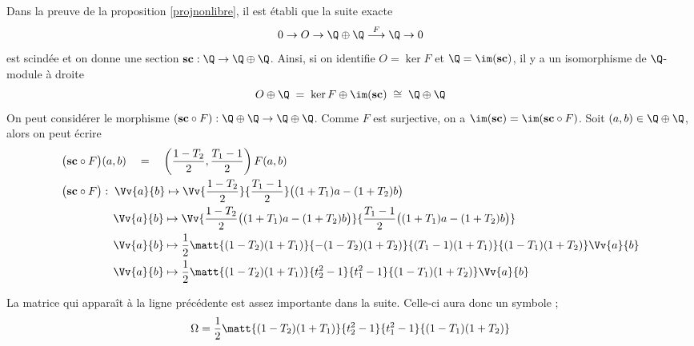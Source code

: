 Dans la preuve de la proposition \ref{projnonlibre}, il est établi que la suite exacte 
$$ 0 \rightarrow O \rightarrow \Q \oplus \Q \stackrel{F}{\longrightarrow}\Q \rightarrow 0 $$ 
est scindée et on donne une section $\mathbf{sc} : \Q \rightarrow \Q \oplus \Q$. Ainsi, si on identifie $O = \ker F$ et $\Q = \im (\mathbf{sc})$, il y a un isomorphisme de $\Q$-module à droite 
\begin{equation} \label{decompositionisomar}
O \oplus \Q \; = \; \ker F \oplus \im (\mathbf{sc}) \; \cong \; \Q \oplus \Q
\end{equation}
On peut considérer le morphisme $(\mathbf{sc} \circ F) : \Q \oplus \Q \rightarrow \Q \oplus \Q$. Comme $F$ est surjective, on a $\im (\mathbf{sc}) = \im (\mathbf{sc} \circ F)$. Soit $(a,b) \in \Q \oplus \Q$, alors on peut écrire
\begin{align*}
&\big(\mathbf{sc} \circ F\big)(a,b) \quad = \quad \left(\frac{1-T_2}{2},\frac{T_1-1}{2}\right)F(a,b)\\
&\big(\mathbf{sc} \circ F\big): \; \Vv{a}{b} \mapsto \Vv{\frac{1-T_2}{2}}{\frac{T_1-1}{2}}\big((1+T_1)a - (1+T_2)b\big)\\
&\qquad \qquad \;\,\, \Vv{a}{b} \mapsto \Vv{\frac{1-T_2}{2}\big((1+T_1)a - (1+T_2)b\big)}{\frac{T_1-1}{2}\big((1+T_1)a - (1+T_2)b\big)}\\
&\qquad \qquad \;\,\, \Vv{a}{b} \mapsto \frac{1}{2}\matt{(1-T_2)(1+T_1)}{-(1-T_2)(1+T_2)}{(T_1-1)(1+T_1)}{(1-T_1)(1+T_2)} \Vv{a}{b}\\
&\qquad \qquad \;\,\, \Vv{a}{b} \mapsto \frac{1}{2}\matt{(1-T_2)(1+T_1)}{t_2^2-1}{t_1^2-1}{(1-T_1)(1+T_2)} \Vv{a}{b}
\end{align*}

\begin{Def} La matrice qui apparaît à la ligne précédente est assez importante dans la suite. Celle-ci aura donc un symbole ; 
$$ \Omega = \frac{1}{2}\matt{(1-T_2)(1+T_1)}{t_2^2-1}{t_1^2-1}{(1-T_1)(1+T_2)} $$
\end{Def}

